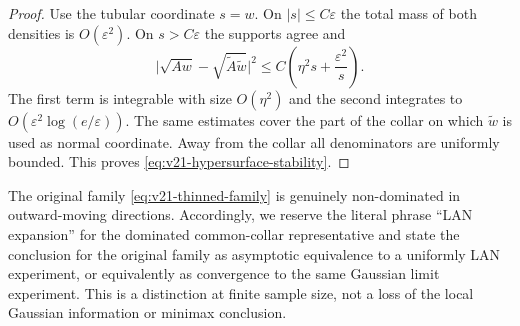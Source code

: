 \begin{proof}
Use the tubular coordinate $s=w$.  On $|s|\le C\varepsilon$ the total mass
of both densities is $O(\varepsilon^2)$.  On
$s>C\varepsilon$ the supports agree and
\[
 \bigl|\sqrt{A w}-\sqrt{\widetilde A\widetilde w}\bigr|^2
 \le C\left(\eta^2s+\frac{\varepsilon^2}{s}\right).
\]
The first term is integrable with size $O(\eta^2)$ and the second integrates
to $O(\varepsilon^2\log(e/\varepsilon))$.  The same estimates cover the
part of the collar on which $\widetilde w$ is used as normal coordinate.
Away from the collar all denominators are uniformly bounded.  This proves
\eqref{eq:v21-hypersurface-stability}.
\end{proof}

\begin{remark}[Terminology]
The original family \eqref{eq:v21-thinned-family} is genuinely
non-dominated in outward-moving directions.  Accordingly, we reserve the
literal phrase ``LAN expansion'' for the dominated common-collar
representative and state the conclusion for the original family as
asymptotic equivalence to a uniformly LAN experiment, or equivalently as
convergence to the same Gaussian limit experiment.  This is a distinction at
finite sample size, not a loss of the local Gaussian information or minimax
conclusion.
\end{remark}

